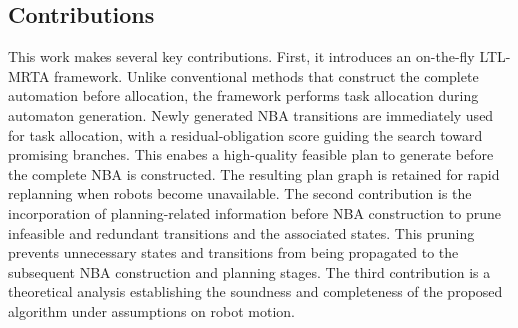 \documentclass[lettersize,journal]{IEEEtran}
\theoremstyle{italiclemma}
\theoremstyle{italiclemma}
\theoremstyle{definition}
\begin{document}














\subsection{Contributions}

This work makes several key contributions. First, it introduces an on-the-fly LTL-MRTA framework. Unlike conventional methods that construct the complete automation before allocation, the framework performs task allocation during automaton generation. Newly generated NBA transitions are immediately used for task allocation, with a residual-obligation score guiding the search toward promising branches. This enabes a high-quality feasible plan to generate before the complete NBA is constructed. The resulting plan graph is retained for rapid replanning when robots become unavailable. The second contribution is the incorporation of planning-related information before NBA construction to prune infeasible and redundant transitions and the associated states. This pruning prevents unnecessary states and transitions from being propagated to the subsequent NBA construction and planning stages. The third contribution is a theoretical analysis establishing the soundness and completeness of the proposed algorithm under assumptions on robot motion.
\end{document}
